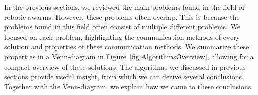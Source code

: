 


In the previous sections, we reviewed the main problems found in the field of robotic swarms. 
However, these problems often overlap.
This is because the problems found in this field often consist of multiple different problems. 
We focused on each problem, highlighting the communication methods of every solution and properties of these communication methods. 
We summarize these properties in a Venn-diagram in Figure~\ref{fig:AlgorithmsOverview}, allowing for a compact overview of these solutions.
The algorithms we discussed in previous sections provide useful insight, from which we can derive several conclusions.
Together with the Venn-diagram, we explain how we came to these conclusions. \\


